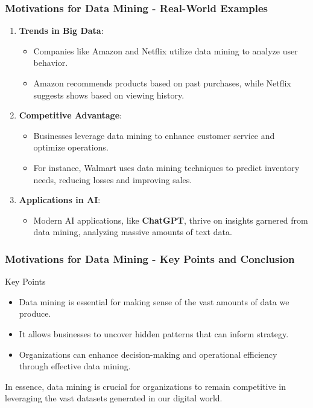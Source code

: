 \documentclass[aspectratio=169]{beamer}
\begin{document}
\begin{frame}[fragile]
  \frametitle{Motivations for Data Mining - Real-World Examples}
  \begin{enumerate}[resume]
    \item \textbf{Trends in Big Data}:
      \begin{itemize}
        \item Companies like Amazon and Netflix utilize data mining to analyze user behavior.
        \item Amazon recommends products based on past purchases, while Netflix suggests shows based on viewing history.
      \end{itemize}
    
    \item \textbf{Competitive Advantage}:
      \begin{itemize}
        \item Businesses leverage data mining to enhance customer service and optimize operations.
        \item For instance, Walmart uses data mining techniques to predict inventory needs, reducing losses and improving sales.
      \end{itemize}
      
    \item \textbf{Applications in AI}:
      \begin{itemize}
        \item Modern AI applications, like \textbf{ChatGPT}, thrive on insights garnered from data mining, analyzing massive amounts of text data.
      \end{itemize}
  \end{enumerate}
\end{frame}

\begin{frame}[fragile]
  \frametitle{Motivations for Data Mining - Key Points and Conclusion}
  \begin{block}{Key Points}
    \begin{itemize}
      \item Data mining is essential for making sense of the vast amounts of data we produce.
      \item It allows businesses to uncover hidden patterns that can inform strategy.
      \item Organizations can enhance decision-making and operational efficiency through effective data mining.
    \end{itemize}
  \end{block}
  
  In essence, data mining is crucial for organizations to remain competitive in leveraging the vast datasets generated in our digital world.
\end{frame}
\end{document}
